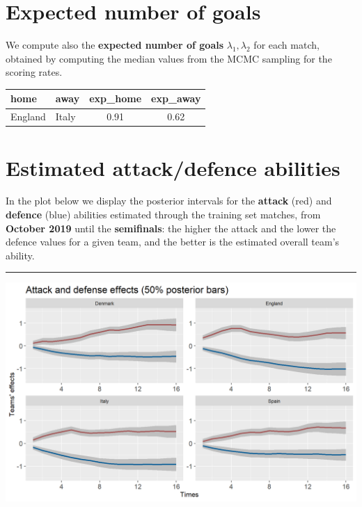 \documentclass[
  10pt,
]{article}
\begin{document}
\hypertarget{expected-number-of-goals}{%
\section{Expected number of goals}\label{expected-number-of-goals}}

We compute also the \textbf{expected number of goals}
\(\lambda_1, \lambda_2\) for each match, obtained by computing the
median values from the MCMC sampling for the scoring rates.

\begin{longtable}[]{@{}llcc@{}}
\toprule
home & away & exp\_home & exp\_away\tabularnewline
\midrule
\endhead
England & Italy & 0.91 & 0.62\tabularnewline
\bottomrule
\end{longtable}

\hypertarget{estimated-attackdefence-abilities}{%
\section{Estimated attack/defence
abilities}\label{estimated-attackdefence-abilities}}

In the plot below we display the posterior intervals for the
\textbf{attack} (red) and \textbf{defence} (blue) abilities estimated
through the training set matches, from \textbf{October 2019} until the
\textbf{semifinals}: the higher the attack and the lower the defence
values for a given team, and the better is the estimated overall team's
ability.

\begin{center}\rule{0.5\linewidth}{0.5pt}\end{center}

\begin{center}\includegraphics[width=0.9\linewidth]{figs/data-1} \end{center}
\end{document}
